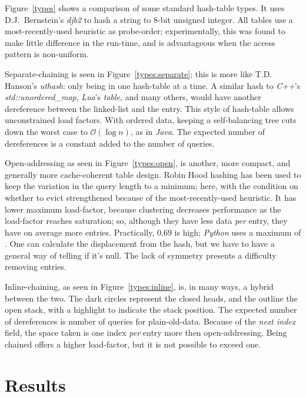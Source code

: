 \documentclass[12pt]{article}
\begin{document}
Figure~\ref{types} shows a comparison of some standard hash-table types. It uses D.J.~Bernstein's {\it djb2} to hash a string to 8-bit unsigned integer. All tables use a most-recently-used heuristic as probe-order; experimentally, this was found to make little difference in the run-time, and is advantageous when the access pattern is non-uniform\cite{brent1973reducing, sleator1985self}.

Separate-chaining is seen in Figure~\ref{types:separate}; this is more like T.D. Hanson's {\it uthash}: only being in one hash-table at a time. A similar hash to {\it C++}'s {\it std::unordered\_map}, {\it Lua}'s {\it table}, and many others, would have another dereference between the linked-list and the entry. This style of hash-table allows unconstrained load factors. With ordered data, keeping a self-balancing tree cuts down the worst case to $\mathcal{O}(\log n)$\cite{knuth1998sorting}, as in {\it Java}. The expected number of dereferences is a constant added to the number of queries.

Open-addressing\cite{peterson1957addressing} as seen in Figure~\ref{types:open}, is another, more compact, and generally more cache-coherent table design. Robin Hood hashing\cite{celis1985robin} has been used to keep the variation in the query length to a minimum; here, with the condition on whether to evict strengthened because of the most-recently-used heuristic. It has lower maximum load-factor, because clustering decreases performance as the load-factor reaches saturation\cite{skiena2008algorithm}; so, although they have less data {\it per} entry, they have on average more entries. Practically, 0.69 is high; {\it Python}\cite{knuth1998sorting} uses a maximum of . One can calculate the displacement from the hash, but we have to have a general way of telling if it's null. The lack of symmetry presents a difficulty removing entries.

Inline-chaining, as seen in Figure~\ref{types:inline}, is, in many ways, a hybrid between the two. The dark circles represent the closed heads, and the outline the open stack, with a highlight to indicate the stack position. The expected number of dereferences is number of queries for plain-old-data. Because of the {\it next index} field, the space taken is one index {\it per} entry more then open-addressing. Being chained offers a higher load-factor, but it is not possible to exceed one.

\section{Results}
\end{document}
